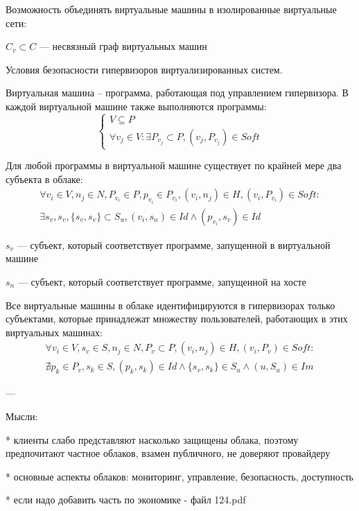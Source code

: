 Возможность объединять виртуальные машины в изолированные виртуальные сети:

$C_v \subset C$ --- несвязный граф виртуальных машин

Условия безопасности гипервизоров виртуализированных систем.

Виртуальная машина – программа, работающая под управлением гипервизора.
В каждой виртуальной машине также выполняются программы:
\begin{equation}
\left\{\begin{matrix}
V \subseteq P \\
\forall v_j \in V : \exists P_{v_j} \subset P,(v_j,P_{v_j}) \in Soft
\end{matrix}\right.
\end{equation}

Для любой программы в виртуальной машине существует по крайней мере два субъекта в облаке:
\begin{multline}
\forall v_i \in V, n_j \in N, P_{v_i} \in P, p_{v_i} \in P_{v_i}, (v_i, n_j) \in H, (v_i, P_{v_i}) \in Soft : \\
\exists s_v, s_v, \{s_v, s_v\} \subset S_u, (v_i, s_n) \in Id \wedge (p_{v_i}, s_v) \in Id
\end{multline}

$s_v$ --- субъект, который соответствует программе, запущенной в виртуальной машине

$s_n$ --- субъект, который соответствует программе, запущенной на хосте

Все виртуальные машины в облаке идентифицируются в гипервизорах только субъектами, которые принадлежат множеству пользователей, работающих в этих виртуальных машинах:
\begin{multline}
\forall v_i \in V, s_v \in S, n_j \in N, P_v \subset P, (v_i, n_j) \in H, (v_i, P_v) \in Soft : \\
\nexists p_k \in P_v, s_k \in S, (p_k, s_k) \in Id  \wedge \{s_v, s_k\} \in S_u \wedge (u, S_u) \in Im
\end{multline}
\fi

\iffalse
---

Мысли:

* клиенты слабо представляют насколько защищены облака, поэтому предпочитают частное облаков, взамен публичного, не доверяют провайдеру

* основные аспекты облаков: мониторинг, управление, безопасность, доступность

* если надо добавить часть по экономике - файл 124.pdf

